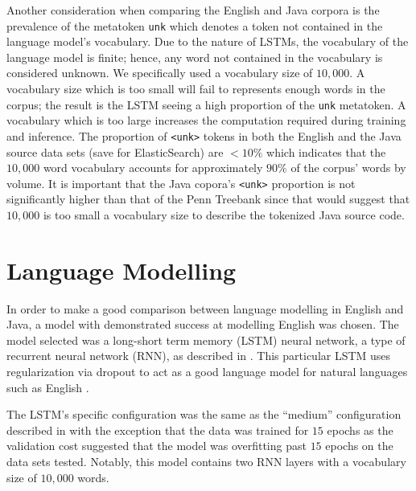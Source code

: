 \documentclass{article}
\begin{document}
Another consideration when comparing the English and Java corpora is the
prevalence of the metatoken \texttt{unk} which denotes a token not contained
in the language model's vocabulary.
Due to the nature of LSTMs, the vocabulary of the language model is finite;
hence, any word not contained in the vocabulary is considered unknown.
We specifically used a vocabulary size of $10,000$. A vocabulary size which
is too small will fail to represents enough words in the corpus; the result
is the LSTM seeing a high proportion of the \texttt{unk} metatoken. A
vocabulary which is too large increases the computation required during
training and inference.
The proportion of \texttt{<unk>} tokens in both the English and the Java
source data sets (save for ElasticSearch) are $<10\%$ which indicates that
the $10,000$ word vocabulary accounts for approximately $90\%$ of the corpus'
words by volume. It is important that the Java copora's \texttt{<unk>}
proportion is not significantly higher than that of the Penn Treebank since
that would suggest that $10,000$ is too small a vocabulary size to describe
the tokenized Java source code.

\section{Language Modelling}
\label{language-modelling}


In order to make a good comparison between language modelling in English
and Java, a model with demonstrated success at modelling English was
chosen. The model selected was a long-short term memory (LSTM) neural
network, a type of recurrent neural network (RNN), as described in
\citet{LSTMArticle}. This particular LSTM uses regularization via 
dropout to act as a good language model for natural languages
such as English \cite{LSTMArticle}.


The LSTM's specific configuration was the same as the ``medium''
configuration described in \citet{LSTMArticle} with the exception
that the data was trained for $15$ epochs as the validation cost
suggested that the model was overfitting past $15$ epochs on the data
sets tested. Notably, this model contains two RNN layers with a vocabulary
size of $10,000$ words.
\end{document}
